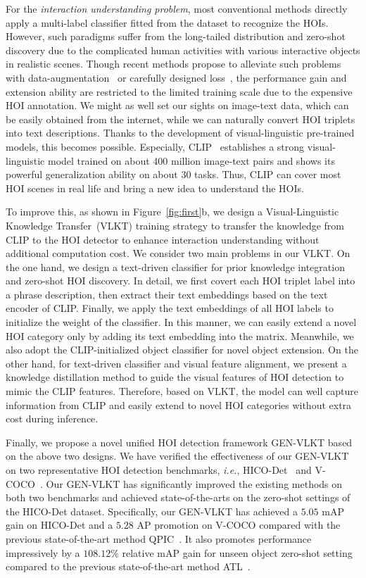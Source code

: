 \documentclass[10pt,twocolumn,letterpaper]{article}
\begin{document}
For the \emph{interaction understanding problem}, most conventional methods directly apply a multi-label classifier fitted from the dataset to recognize the HOIs.
However, such paradigms suffer from the long-tailed distribution and zero-shot discovery due to the complicated human activities with various interactive objects in realistic scenes. Though recent methods propose to alleviate such problems with data-augmentation~\cite{hou2021affordance} or carefully designed loss~\cite{zhong2021glance}, the performance gain and extension ability are restricted to the limited training scale due to the expensive HOI annotation. We might as well set our sights on image-text data, which can be easily obtained from the internet, while we can naturally convert HOI triplets into text descriptions. Thanks to the development of visual-linguistic pre-trained models, this becomes possible. Especially, CLIP~\cite{radford2021learning} establishes a strong visual-linguistic model trained on about 400 million image-text pairs and shows its powerful generalization ability on about $30$ tasks. Thus, CLIP can cover most HOI scenes in real life and bring a new idea to understand the HOIs. 

To improve this, as shown in Figure~\ref{fig:first}b, we design a Visual-Linguistic Knowledge Transfer~(VLKT) training strategy to transfer the knowledge from CLIP to the HOI detector to enhance interaction understanding without additional computation cost. We consider two main problems in our VLKT. On the one hand, we design a text-driven classifier for prior knowledge integration and zero-shot HOI discovery. In detail, we first covert each HOI triplet label into a phrase description, then extract their text embeddings based on the text encoder of CLIP. Finally,  we apply the text embeddings of all HOI labels to initialize the weight of the classifier. In this manner, we can easily extend a novel HOI category only by adding its text embedding into the matrix. Meanwhile, we also adopt the CLIP-initialized object classifier for novel object extension. On the other hand, for text-driven classifier and visual feature alignment, we present a knowledge distillation method to guide the visual features of HOI detection to mimic the CLIP features. Therefore, based on VLKT, the model can well capture information from CLIP and easily extend to novel HOI categories without extra cost during inference.

Finally, we propose a novel unified HOI detection framework GEN-VLKT based on the above two designs. We have verified the effectiveness of our GEN-VLKT on two representative HOI detection benchmarks, \emph{i.e.}, HICO-Det~\cite{qi2018learning}
 and V-COCO~\cite{gupta2015visual}. Our GEN-VLKT has significantly improved the existing methods on both two benchmarks and achieved state-of-the-arts on the zero-shot settings of the HICO-Det dataset. Specifically, our GEN-VLKT has achieved a $5.05$ mAP gain on HICO-Det and a $5.28$ AP promotion on V-COCO compared with the previous state-of-the-art method QPIC~\cite{tamura2021qpic}. It also promotes performance impressively by a $108.12\%$ relative mAP gain for unseen object zero-shot setting compared to the previous state-of-the-art method ATL~\cite{hou2021affordance}. 
 
\end{document}
